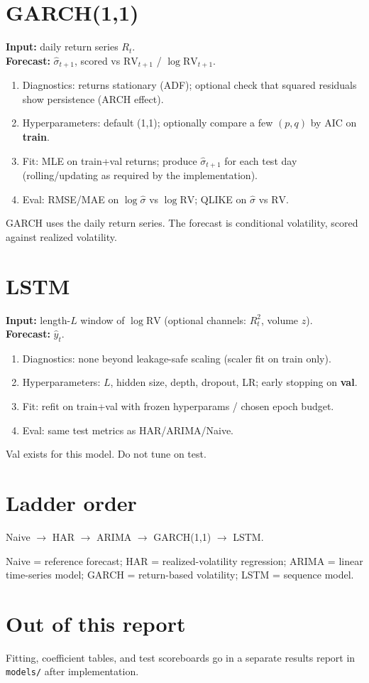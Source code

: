 \documentclass[12pt]{article}
\begin{document}
\section{GARCH(1,1)}
\textbf{Input:} daily return series \(R_t\).\\
\textbf{Forecast:} \(\hat\sigma_{t+1}\), scored vs \(\mathrm{RV}_{t+1}\) / \(\log\mathrm{RV}_{t+1}\).
\begin{enumerate}
  \item Diagnostics: returns stationary (ADF); optional check that squared residuals show persistence (ARCH effect).
  \item Hyperparameters: default (1,1); optionally compare a few \((p,q)\) by AIC on \textbf{train}.
  \item Fit: MLE on train+val returns; produce \(\hat\sigma_{t+1}\) for each test day (rolling/updating as required by the implementation).
  \item Eval: RMSE/MAE on \(\log\hat\sigma\) vs \(\log\mathrm{RV}\); QLIKE on \(\hat\sigma\) vs \(\mathrm{RV}\).
\end{enumerate}
\begin{explain}
GARCH uses the daily return series. The forecast is conditional volatility, scored against realized volatility.
\end{explain}

\section{LSTM}
\textbf{Input:} length-\(L\) window of \(\log\mathrm{RV}\) (optional channels: \(R_t^2\), volume \(z\)).\\
\textbf{Forecast:} \(\hat y_t\).
\begin{enumerate}
  \item Diagnostics: none beyond leakage-safe scaling (scaler fit on train only).
  \item Hyperparameters: \(L\), hidden size, depth, dropout, LR; early stopping on \textbf{val}.
  \item Fit: refit on train+val with frozen hyperparams / chosen epoch budget.
  \item Eval: same test metrics as HAR/ARIMA/Naive.
\end{enumerate}
\begin{explain}
Val exists for this model. Do not tune on test.
\end{explain}

\section{Ladder order}
Naive \(\rightarrow\) HAR \(\rightarrow\) ARIMA \(\rightarrow\) GARCH(1,1) \(\rightarrow\) LSTM.
\begin{explain}
Naive = reference forecast; HAR = realized-volatility regression; ARIMA = linear time-series model; GARCH = return-based volatility; LSTM = sequence model.
\end{explain}

\section{Out of this report}
Fitting, coefficient tables, and test scoreboards go in a separate results report in \texttt{models/} after implementation.
\end{document}
